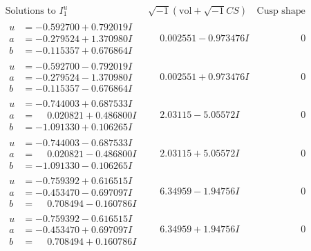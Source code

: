 \documentclass[1p]{elsarticle_modified}
\theoremstyle{definition}
\newcommand{\I}{\sqrt{-1}}
\begin{document}
$$\begin{array}{c|c|c}  
\text{Solutions to }I^u_{1}& \I (\text{vol} + \sqrt{-1}CS) & \text{Cusp shape}\\
 \hline 
\begin{aligned}
u &= -0.592700 + 0.792019 I \\
a &= -0.279524 + 1.370980 I \\
b &= -0.115357 + 0.676864 I\end{aligned}
 & \phantom{-}0.002551 - 0.973476 I & \phantom{-0.000000 } 0 \\ \hline\begin{aligned}
u &= -0.592700 - 0.792019 I \\
a &= -0.279524 - 1.370980 I \\
b &= -0.115357 - 0.676864 I\end{aligned}
 & \phantom{-}0.002551 + 0.973476 I & \phantom{-0.000000 } 0 \\ \hline\begin{aligned}
u &= -0.744003 + 0.687533 I \\
a &= \phantom{-}0.020821 + 0.486800 I \\
b &= -1.091330 + 0.106265 I\end{aligned}
 & \phantom{-}2.03115 - 5.05572 I & \phantom{-0.000000 } 0 \\ \hline\begin{aligned}
u &= -0.744003 - 0.687533 I \\
a &= \phantom{-}0.020821 - 0.486800 I \\
b &= -1.091330 - 0.106265 I\end{aligned}
 & \phantom{-}2.03115 + 5.05572 I & \phantom{-0.000000 } 0 \\ \hline\begin{aligned}
u &= -0.759392 + 0.616515 I \\
a &= -0.453470 - 0.697097 I \\
b &= \phantom{-}0.708494 - 0.160786 I\end{aligned}
 & \phantom{-}6.34959 - 1.94756 I & \phantom{-0.000000 } 0 \\ \hline\begin{aligned}
u &= -0.759392 - 0.616515 I \\
a &= -0.453470 + 0.697097 I \\
b &= \phantom{-}0.708494 + 0.160786 I\end{aligned}
 & \phantom{-}6.34959 + 1.94756 I & \phantom{-0.000000 } 0 \\ \hline\begin{aligned}

\end{aligned}
\end{array}$$
\end{document}
